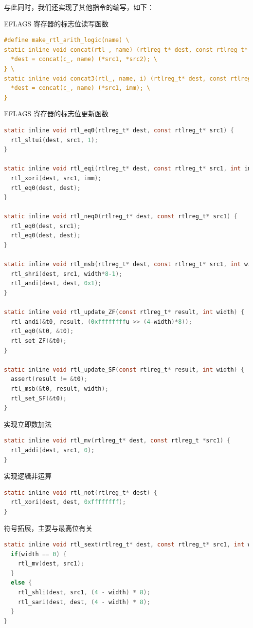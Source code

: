 \documentclass[UTF8,a4paper,10pt]{ctexart}
\begin{document}
 与此同时，我们还实现了其他指令的编写，如下：

EFLAGS 寄存器的标志位读写函数
\begin{lstlisting}[language = C]
#define make_rtl_arith_logic(name) \
static inline void concat(rtl_, name) (rtlreg_t* dest, const rtlreg_t* src1, const rtlreg_t* src2) { \
  *dest = concat(c_, name) (*src1, *src2); \
} \
static inline void concat3(rtl_, name, i) (rtlreg_t* dest, const rtlreg_t* src1, int imm) { \
  *dest = concat(c_, name) (*src1, imm); \
}
\end{lstlisting}

EFLAGS 寄存器的标志位更新函数
\begin{lstlisting}[language = C]
static inline void rtl_eq0(rtlreg_t* dest, const rtlreg_t* src1) {
  rtl_sltui(dest, src1, 1);
}

static inline void rtl_eqi(rtlreg_t* dest, const rtlreg_t* src1, int imm) {
  rtl_xori(dest, src1, imm);
  rtl_eq0(dest, dest);
}

static inline void rtl_neq0(rtlreg_t* dest, const rtlreg_t* src1) {
  rtl_eq0(dest, src1);
  rtl_eq0(dest, dest);
}

static inline void rtl_msb(rtlreg_t* dest, const rtlreg_t* src1, int width) {
  rtl_shri(dest, src1, width*8-1);
  rtl_andi(dest, dest, 0x1);
}

static inline void rtl_update_ZF(const rtlreg_t* result, int width) {
  rtl_andi(&t0, result, (0xffffffffu >> (4-width)*8));
  rtl_eq0(&t0, &t0);
  rtl_set_ZF(&t0);
}

static inline void rtl_update_SF(const rtlreg_t* result, int width) {
  assert(result != &t0);
  rtl_msb(&t0, result, width);
  rtl_set_SF(&t0);
}
\end{lstlisting}

实现立即数加法
\begin{lstlisting}[language = C]
static inline void rtl_mv(rtlreg_t* dest, const rtlreg_t *src1) {
  rtl_addi(dest, src1, 0);
}
\end{lstlisting}

实现逻辑非运算
\begin{lstlisting}[language = C]
static inline void rtl_not(rtlreg_t* dest) {
  rtl_xori(dest, dest, 0xffffffff);
}
\end{lstlisting}

符号拓展，主要与最高位有关
\begin{lstlisting}[language = C]
static inline void rtl_sext(rtlreg_t* dest, const rtlreg_t* src1, int width) {
  if(width == 0) {
    rtl_mv(dest, src1);
  }
  else {
    rtl_shli(dest, src1, (4 - width) * 8);
    rtl_sari(dest, dest, (4 - width) * 8);
  }
}
\end{lstlisting}
\end{document}
